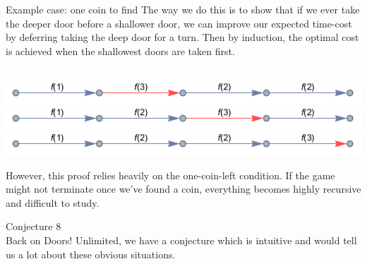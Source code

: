 \documentclass[final]{beamer}
\begin{document}
\begin{columns}[t]
\begin{column}{.3 \linewidth}
\begin{block}{Example case: one coin to find}
The way we do this is to show that if we ever take the deeper door before a shallower door, we can improve our expected time-cost by deferring taking the deep door for a turn.
Then by induction, the optimal cost is achieved when the shallowest doors are taken first. \\~\\

\begin{center}
\includegraphics[width=0.5 \linewidth]{corridoors1} \\
\includegraphics[width=0.5 \linewidth]{corridoors2} \\
\includegraphics[width=0.5 \linewidth]{corridoors3}
\end{center}

However, this proof relies heavily on the one-coin-left condition.
If the game might not terminate once we've found a coin, everything becomes highly recursive and difficult to study.


\end{block}
\vspace{\baselineskip}

\vspace{\baselineskip}

\begin{block}{Conjecture 8}\ \\

Back on Doors! Unlimited, we have a conjecture which is intuitive and would tell us a lot about these obvious situations. \\~\\



\end{block}
\end{column}
\end{columns}
\end{document}
